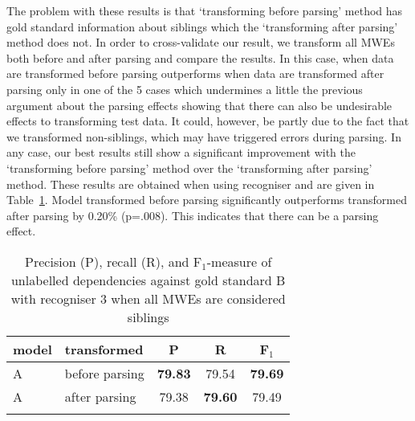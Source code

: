 \documentclass[output=paper]{langsci/langscibook}
\begin{document}
\indent The problem with these results is that `transforming before parsing' method has gold standard information about siblings which the `transforming after parsing' method does not. In order to cross-validate our result, we transform all MWEs both before and after parsing and compare the results. In this case, {\modelA} when data are transformed before parsing outperforms {\modelA} when data are transformed after parsing only in one of the 5 cases which undermines a little the previous argument about the parsing effects showing that there can also be undesirable effects to transforming test data. It could, however, be partly due to the fact that we transformed non-siblings, which may have triggered errors during parsing. In any case, our best results still show a significant improvement with the `transforming before parsing' method over the `transforming after parsing' method. These results are obtained when using recogniser and are given in Table~\ref{del:tab:res1tris}. Model transformed before parsing significantly outperforms {\modelA} transformed after parsing by 0.20\% (p=.008). This indicates that there can be a parsing effect.

\begin{table}[h]
    \footnotesize
    \def\arraystretch{1.20} 
    \centering
    \begin{tabular}{l l c c c} %
      \lsptoprule
        \textnormal{model}
        & \textnormal{transformed}
        & \textnormal{P}
        & \textnormal{R}
        & \textnormal{F$_1$}
        \\ %
        \midrule
        A & before parsing &\textbf{79.83} & 79.54  & \textbf{79.69} \\
        A & after parsing &79.38  &\textbf{79.60}  & 79.49 \tabularnewline %
        \lspbottomrule
    \end{tabular}
    \caption{Precision (P), recall (R), and F$_1$-measure of unlabelled dependencies against gold standard B with recogniser 3 when all MWEs are considered siblings \label{del:tab:res1tris}}
\end{table}
\end{document}
